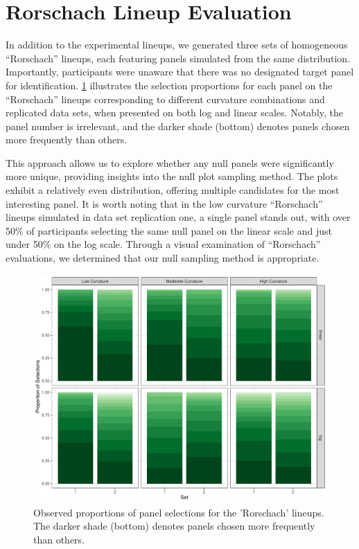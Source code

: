 \documentclass[12pt]{article}
\begin{document}
\renewcommand{\thesection}{B}

\hypertarget{rorschach-lineup-evaluation}{%
\section{Rorschach Lineup
Evaluation}\label{rorschach-lineup-evaluation}}

In addition to the experimental lineups, we generated three sets of
homogeneous ``Rorschach'' lineups, each featuring panels simulated from
the same distribution. Importantly, participants were unaware that there
was no designated target panel for identification.
\cref{fig:rorschach-lineups} illustrates the selection proportions for
each panel on the ``Rorschach'' lineups corresponding to different
curvature combinations and replicated data sets, when presented on both
log and linear scales. Notably, the panel number is irrelevant, and the
darker shade (bottom) denotes panels chosen more frequently than others.

This approach allows us to explore whether any null panels were
significantly more unique, providing insights into the null plot
sampling method. The plots exhibit a relatively even distribution,
offering multiple candidates for the most interesting panel. It is worth
noting that in the low curvature ``Rorschach'' lineups simulated in data
set replication one, a single panel stands out, with over 50\% of
participants selecting the same null panel on the linear scale and just
under 50\% on the log scale. Through a visual examination of
``Rorschach'' evaluations, we determined that our null sampling method
is appropriate.

\begin{figure}[tbp]

{\centering \includegraphics[width=\linewidth,]{appendix_files/figure-latex/rorschach-lineups-1} 

}

\caption{Observed proportions of panel selections for the 'Rorschach' lineups. The darker shade (bottom) denotes panels chosen more frequently than others.}\label{fig:rorschach-lineups}
\end{figure}
\end{document}
